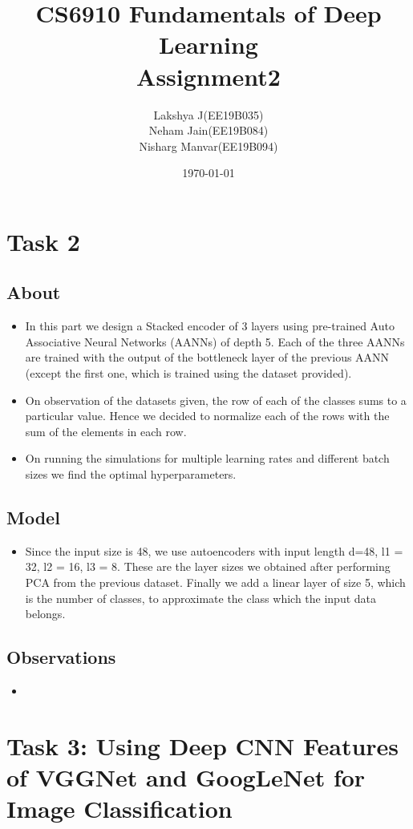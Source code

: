 \documentclass{article}
\title{CS6910 Fundamentals of Deep Learning \\ Assignment2}
\author{Lakshya J(EE19B035)\\ Neham Jain(EE19B084)\\ Nisharg Manvar(EE19B094)}
\date{\today}
\begin{document}
\maketitle
\section{Task 2}
\subsection{About}
\begin{itemize}
    \item In this part we design a Stacked encoder of 3 layers using pre-trained Auto Associative Neural Networks (AANNs) of depth 5. Each of the three AANNs are trained with the output of the bottleneck layer of the previous AANN (except the first one, which is trained using the dataset provided).
    \item On observation of the datasets given, the row of each of the classes sums to a particular value. Hence we decided to normalize each of the rows with the sum of the elements in each row.
    \item On running the simulations for multiple learning rates and different batch sizes we find the optimal hyperparameters.
\end{itemize}

\subsection{Model}
\begin{itemize}
    \item Since the input size is 48, we use autoencoders with input length d=48, l1 = 32, l2 = 16, l3 = 8. These are the layer sizes we obtained after performing PCA from the previous dataset. Finally we add a linear layer of size 5, which is the number of classes, to approximate the class which the input data belongs.
\end{itemize}

\subsection{Observations}
\begin{itemize}
    \item 
\end{itemize}

\section*{Task 3: Using Deep CNN Features of VGGNet and GoogLeNet for Image Classification}
\end{document}
